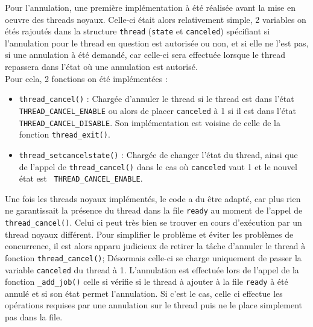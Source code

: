 Pour l'annulation, une première implémentation à été réalisée avant la mise en oeuvre des threads noyaux. Celle-ci était alors relativement simple, 2 variables on étés rajoutés dans la structure \verb!thread! (\verb!state! et \verb!canceled!) spécifiant si l'annulation pour le thread en question est autorisée ou non, et si elle ne l'est pas, si une annulation à été demandé, car celle-ci sera effectuée lorsque le thread repassera dans l'état où une annulation est autorisé.\\

Pour cela, 2 fonctions on été implémentées :
\begin{itemize}
\item \verb!thread_cancel()! : Chargée d'annuler le thread si le thread est dans l'état\\ \verb!THREAD_CANCEL_ENABLE! ou alors de placer \verb!canceled! à 1 si il est dans l'état \verb!THREAD_CANCEL_DISABLE!. Son implémentation est voisine de celle de la fonction \verb!thread_exit()!.\\
\item \verb!thread_setcancelstate()! : Chargée de changer l'état du thread, ainsi que de l'appel de \verb!thread_cancel()! dans le cas où \verb!canceled! vaut 1 et le nouvel état est \verb! THREAD_CANCEL_ENABLE!.
\end{itemize}

Une fois les threads noyaux implémentés, le code a du être adapté, car plus rien ne garantissait la présence du thread dans la file \verb!ready! au moment de l'appel de \verb!thread_cancel()!. Celui ci peut très bien se trouver en cours d'exécution par un thread noyaux différent. Pour simplifier le problème et éviter les problèmes de concurrence, il est alors apparu judicieux de retirer la tâche d'annuler le thread à fonction \verb!thread_cancel()!; Désormais celle-ci se charge uniquement de passer la variable \verb!canceled! du thread à 1. L'annulation est effectuée lors de l'appel de la fonction \verb!_add_job()! celle si vérifie si le thread à ajouter à la file \verb!ready! à été annulé et si son état permet l'annulation. Si c'est le cas, celle ci effectue les opérations requises par une annulation sur le thread puis ne le place simplement pas dans la file.
